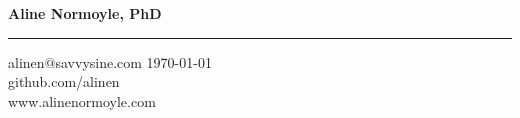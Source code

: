 {\Large {\bf Aline Normoyle, PhD}}
\hrule
alinen$@$savvysine.com \hfill \today \\
github.com/alinen\\
\textcolor{Periwinkle}{www.alinenormoyle.com}


